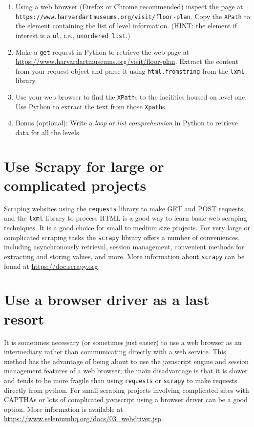 \documentclass[]{book}
\providecommand{\tightlist}{%
  \setlength{\itemsep}{0pt}\setlength{\parskip}{0pt}}
\begin{document}
\begin{enumerate}
\def\labelenumi{\arabic{enumi}.}
\tightlist
\item
  Using a web browser (Firefox or Chrome recommended) inspect the page
  at \texttt{https://www.harvardartmuseums.org/visit/floor-plan}. Copy
  the \texttt{XPath} to the element containing the list of level
  information. (HINT: the element if interest is a \texttt{ul}, i.e.,
  \texttt{unordered\ list}.)
\item
  Make a \texttt{get} request in Python to retrieve the web page at
  \url{https://www.harvardartmuseums.org/visit/floor-plan}. Extract the
  content from your request object and parse it using
  \texttt{html.fromstring} from the \texttt{lxml} library.
\item
  Use your web browser to find the \texttt{XPath}s to the facilities
  housed on level one. Use Python to extract the text from those
  \texttt{Xpath}s.
\item
  Bonus (optional): Write a \emph{loop} or \emph{list comprehension} in
  Python to retrieve data for all the levels.
\end{enumerate}

\section{Use Scrapy for large or complicated
projects}\label{use-scrapy-for-large-or-complicated-projects}

Scraping websites using the \texttt{requests} library to make GET and
POST requests, and the \texttt{lxml} library to process HTML is a good
way to learn basic web scraping techniques. It is a good choice for
small to medium size projects. For very large or complicated scraping
tasks the \texttt{scrapy} library offers a number of conveniences,
including asynchronously retrieval, session management, convenient
methods for extracting and storing values, and more. More information
about \texttt{scrapy} can be found at \url{https://doc.scrapy.org}.

\section{Use a browser driver as a last
resort}\label{use-a-browser-driver-as-a-last-resort}

It is sometimes necessary (or sometimes just easier) to use a web
browser as an intermediary rather than communicating directly with a web
service. This method has the advantage of being about to use the
javascript engine and session management features of a web browser; the
main disadvantage is that it is slower and tends to be more fragile than
using \texttt{requests} or \texttt{scrapy} to make requests directly
from python. For small scraping projects involving complicated sites
with CAPTHAs or lots of complicated javascript using a browser driver
can be a good option. More information is available at
\url{https://www.seleniumhq.org/docs/03_webdriver.jsp}.
\end{document}
